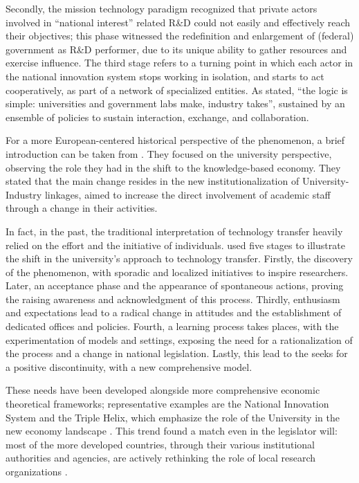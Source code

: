 Secondly, the mission technology paradigm recognized that private actors involved in \enquote{national interest} related R\&D could not easily and effectively reach their objectives; this phase witnessed the redefinition and enlargement of (federal) government as R\&D performer, due to its unique ability to gather resources and exercise influence. The third stage refers to a turning point in which each actor in the national innovation system stops working in isolation, and starts to act cooperatively, as part of a network of specialized entities. As stated, \enquote{the logic is simple: universities and government labs make, industry takes}, sustained by an ensemble of policies to sustain interaction, exchange, and collaboration. 

For a more European-centered historical perspective of the phenomenon, a brief introduction can be taken from \citet{Geuna2009}. They focused on the university perspective, observing the role they had in the shift to the knowledge-based economy. They stated that the main change resides in the new institutionalization of University-Industry linkages, aimed to increase the direct involvement of academic staff through a change in their activities.

In fact, in the past, the traditional interpretation of technology transfer heavily relied on the effort and the initiative of individuals. \citet{Balderi2007} used five stages to illustrate the shift in the university's approach to technology transfer. Firstly, the discovery of the phenomenon, with sporadic and localized initiatives to inspire researchers. Later, an acceptance phase and the appearance of spontaneous actions, proving the raising awareness and acknowledgment of this process. Thirdly, enthusiasm and expectations lead to a radical change in attitudes and the establishment of dedicated offices and policies. Fourth, a learning process takes places, with the experimentation of models and settings, exposing the need for a rationalization of the process and a change in national legislation. Lastly, this lead to the seeks for a positive discontinuity, with a new comprehensive model.

These needs have been developed alongside more comprehensive economic theoretical frameworks; representative examples are the National Innovation System and the Triple Helix, which emphasize the role of the University in the new economy landscape \citep{Balderi2007}. This trend found a match even in the legislator will: most of the more developed countries, through their various institutional authorities and agencies, are actively rethinking the role of local research organizations \citep{Geuna2009}.

